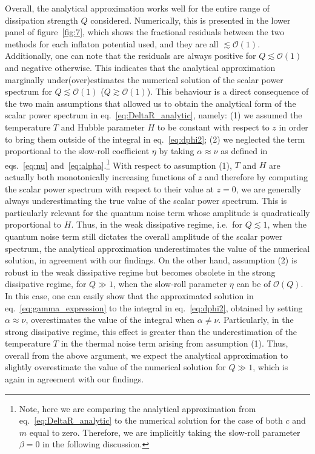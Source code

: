 \documentclass[a4paper,11pt]{article}
\begin{document}
Overall, the analytical approximation works well for the entire range of dissipation strength $Q$ considered. Numerically, this is presented in the lower panel of figure~\ref{fig:7}, which shows the fractional residuals between the two methods for each inflaton potential used, and they are all $\lesssim \mathcal{O}(1)$. Additionally, one can note that the residuals are always positive for $Q\lesssim \mathcal{O}(1)$ and negative otherwise. This indicates that the analytical approximation marginally under(over)estimates the numerical solution of the scalar power spectrum for $Q\lesssim\mathcal{O}(1)$ ($Q\gtrsim\mathcal{O}(1)$). This behaviour is a direct consequence of the two main assumptions that allowed us to obtain the analytical form of the scalar power spectrum in eq.~\eqref{eq:DeltaR_analytic}, namely: (1) we assumed the temperature $T$ and Hubble parameter $H$ to be constant with respect to $z$ in order to bring them outside of the integral in eq.~\eqref{eq:dphi2}; (2) we neglected the term proportional to the slow-roll coefficient $\eta$ by taking $\alpha\approx\nu$ as defined in eqs.~\eqref{eq:nu} and~\eqref{eq:alpha}.\footnote{Note, here we are comparing the analytical approximation from eq.~\eqref{eq:DeltaR_analytic} to the numerical solution for the case of both $c$ and $m$ equal to zero. Therefore, we are implicitly taking the slow-roll parameter $\beta=0$ in the following discussion.} With respect to assumption (1), $T$ and $H$ are actually both monotonically increasing functions of $z$ and therefore by computing the scalar power spectrum with respect to their value at $z=0$, we are generally always underestimating the true value of the scalar power spectrum. This is particularly relevant for the quantum noise term whose amplitude is quadratically proportional to $H$. Thus, in the weak dissipative regime, i.e.\ for $Q\lesssim 1$, when the quantum noise term still dictates the overall amplitude of the scalar power spectrum, the analytical approximation underestimates the value of the numerical solution, in agreement with our findings. On the other hand, assumption (2) is robust in the weak dissipative regime but becomes obsolete in the strong dissipative regime, for $Q\gg1$, when the slow-roll parameter $\eta$ can be of $\mathcal{O}(Q)$. In this case, one can easily show that the approximated solution in eq.~\eqref{eq:gamma_expression} to the integral in eq.~\eqref{eq:dphi2}, obtained by setting $\alpha\approx\nu$, overestimates the value of the integral when $\alpha\neq\nu $. Particularly, in the strong dissipative regime, this effect is greater than the underestimation  of the temperature $T$ in the thermal noise term arising from assumption (1). Thus, overall from the above argument, we expect the analytical approximation to slightly overestimate the value of the numerical solution for $Q\gg1$, which is again in agreement with our findings.
\end{document}
